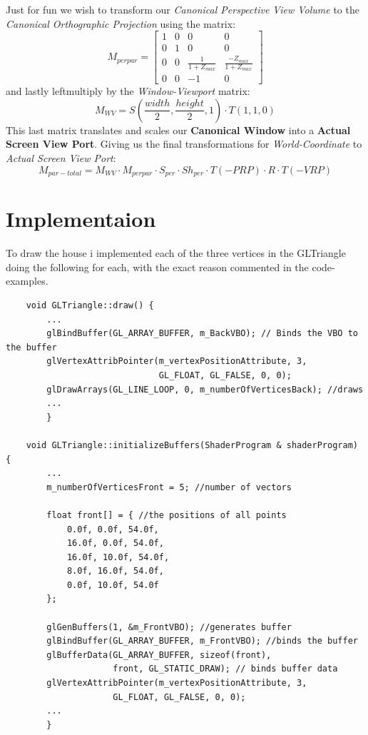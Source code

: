 \documentclass{article}
\begin{document}
Just for fun we wish to transform our \emph{Canonical Perspective View Volume}
to the \emph{Canonical Orthographic Projection} using the matrix:
\begin{equation*}
    M_{perpar} =
    \begin{bmatrix}
        1 & 0 & 0 & 0\\
        0 & 1 & 0 & 0\\
        0 & 0 & \frac{1}{1+Z_{max}} & \frac{-Z_{max}}{1+Z_{max}}\\
        0 & 0 & -1 & 0
    \end{bmatrix}
\end{equation*}
and lastly leftmultiply by the \emph{Window-Viewport} matrix:
\begin{equation*}
    M_{WV} = S(\frac{width}{2},\frac{height}{2},1) \cdot T(1,1,0)
\end{equation*}
This last matrix translates and scales our \textbf{Canonical Window}
into a \textbf{Actual Screen View Port}.
Giving us the final transformations for \emph{World-Coordinate} to \emph{Actual Screen View Port}:
\begin{equation*}
    M_{par-total} = M_{WV} \cdot M_{perpar} \cdot S_{per} \cdot Sh_{per} \cdot T(-PRP) \cdot R \cdot T(-VRP)
\end{equation*}
\newpage
\section{Implementaion}
To draw the house i implemented each of the three vertices 
in the GLTriangle doing the following for each, with the exact reason
commented in the code-examples.
\begin{verbatim}
    void GLTriangle::draw() {
        ...
        glBindBuffer(GL_ARRAY_BUFFER, m_BackVBO); // Binds the VBO to the buffer
        glVertexAttribPointer(m_vertexPositionAttribute, 3, 
                              GL_FLOAT, GL_FALSE, 0, 0);
        glDrawArrays(GL_LINE_LOOP, 0, m_numberOfVerticesBack); //draws
        ...
        }

    void GLTriangle::initializeBuffers(ShaderProgram & shaderProgram) {
        ...
        m_numberOfVerticesFront = 5; //number of vectors

        float front[] = { //the positions of all points 
            0.0f, 0.0f, 54.0f,
            16.0f, 0.0f, 54.0f,
            16.0f, 10.0f, 54.0f,
            8.0f, 16.0f, 54.0f,
            0.0f, 10.0f, 54.0f
        };

        glGenBuffers(1, &m_FrontVBO); //generates buffer
        glBindBuffer(GL_ARRAY_BUFFER, m_FrontVBO); //binds the buffer
        glBufferData(GL_ARRAY_BUFFER, sizeof(front), 
                     front, GL_STATIC_DRAW); // binds buffer data
        glVertexAttribPointer(m_vertexPositionAttribute, 3, 
                     GL_FLOAT, GL_FALSE, 0, 0);
        ...
        }
\end{verbatim}
\end{document}
